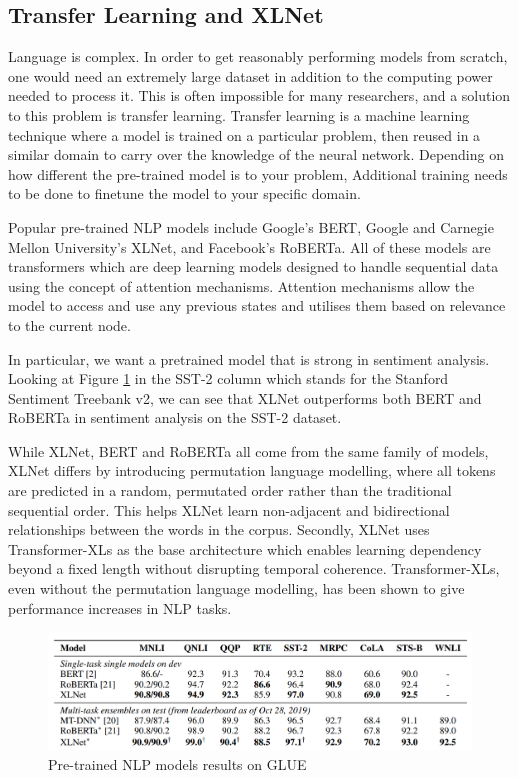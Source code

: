 \documentclass[12pt, a4paper]{article}
\begin{document}
\subsection{Transfer Learning and XLNet}
Language is complex. In order to get reasonably performing models from scratch, one would need an extremely large dataset in addition to the computing power needed to process it. This is often impossible for many researchers, and a solution to this problem is transfer learning. Transfer learning is a machine learning technique where a model is trained on a particular problem, then reused in a similar domain to carry over the knowledge of the neural network. Depending on how different the pre-trained model is to your problem, Additional training needs to be done to finetune the model to your specific domain. \cite{ruder2019transfer}

Popular pre-trained NLP models include Google's BERT, Google and Carnegie Mellon University's XLNet, and Facebook's RoBERTa. All of these models are transformers which are deep learning models designed to handle sequential data using the concept of attention mechanisms. Attention mechanisms allow the model to access and use any previous states and utilises them based on relevance to the current node. \cite{vaswani2017attention} 

In particular, we want a pretrained model that is strong in sentiment analysis. Looking at Figure \ref{benchmarks} in the SST-2 column which stands for the Stanford Sentiment Treebank v2, we can see that XLNet \cite{yang2020xlnet} outperforms both BERT and RoBERTa in sentiment analysis on the SST-2 dataset.

While XLNet, BERT and RoBERTa all come from the same family of models, XLNet differs by introducing permutation language modelling, where all tokens are predicted in a random, permutated order rather than the traditional sequential order. This helps XLNet learn non-adjacent and bidirectional relationships between the words in the corpus. Secondly, XLNet uses Transformer-XLs as the base architecture which enables learning dependency beyond a fixed length without disrupting temporal coherence. \cite{dai2019transformerxl} Transformer-XLs, even without the permutation language modelling, has been shown to give performance increases in NLP tasks. 

\begin{figure}
	\includegraphics[scale=0.45]{benchmarks}
	\caption{Pre-trained NLP models results on GLUE}
	\label{benchmarks}
\end{figure}
\end{document}
